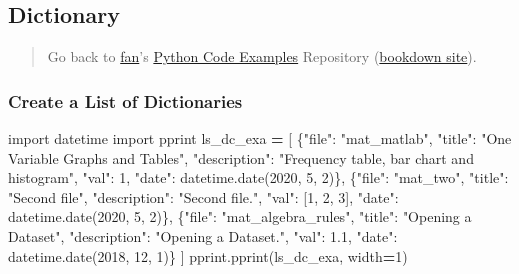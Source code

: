 \documentclass[
]{book}
\newenvironment{Shaded}{\begin{snugshade}}{\end{snugshade}}
\newcommand{\DecValTok}[1]{\textcolor[rgb]{0.00,0.00,0.81}{#1}}
\newcommand{\FloatTok}[1]{\textcolor[rgb]{0.00,0.00,0.81}{#1}}
\newcommand{\ImportTok}[1]{#1}
\newcommand{\NormalTok}[1]{#1}
\newcommand{\OperatorTok}[1]{\textcolor[rgb]{0.81,0.36,0.00}{\textbf{#1}}}
\newcommand{\StringTok}[1]{\textcolor[rgb]{0.31,0.60,0.02}{#1}}
\begin{document}
\hypertarget{dictionary-1}{%
\subsection{Dictionary}\label{dictionary-1}}

\begin{quote}
Go back to \href{http://fanwangecon.github.io/}{fan}'s \href{https://fanwangecon.github.io/pyfan/}{Python Code Examples} Repository (\href{https://fanwangecon.github.io/pyfan/bookdown}{bookdown site}).
\end{quote}

\hypertarget{create-a-list-of-dictionaries}{%
\subsubsection{Create a List of Dictionaries}\label{create-a-list-of-dictionaries}}

\begin{Shaded}
\begin{Highlighting}[]
\ImportTok{import}\NormalTok{ datetime}
\ImportTok{import}\NormalTok{ pprint}
\NormalTok{ls\_dc\_exa }\OperatorTok{=}\NormalTok{  [}
\NormalTok{    \{}\StringTok{"file"}\NormalTok{: }\StringTok{"mat\_matlab"}\NormalTok{,}
     \StringTok{"title"}\NormalTok{: }\StringTok{"One Variable Graphs and Tables"}\NormalTok{,}
     \StringTok{"description"}\NormalTok{: }\StringTok{"Frequency table, bar chart and histogram"}\NormalTok{,}
     \StringTok{"val"}\NormalTok{: }\DecValTok{1}\NormalTok{,}
     \StringTok{"date"}\NormalTok{: datetime.date(}\DecValTok{2020}\NormalTok{, }\DecValTok{5}\NormalTok{, }\DecValTok{2}\NormalTok{)\},}
\NormalTok{    \{}\StringTok{"file"}\NormalTok{: }\StringTok{"mat\_two"}\NormalTok{,}
     \StringTok{"title"}\NormalTok{: }\StringTok{"Second file"}\NormalTok{,}
     \StringTok{"description"}\NormalTok{: }\StringTok{"Second file."}\NormalTok{,}
     \StringTok{"val"}\NormalTok{: [}\DecValTok{1}\NormalTok{, }\DecValTok{2}\NormalTok{, }\DecValTok{3}\NormalTok{],}
     \StringTok{"date"}\NormalTok{: datetime.date(}\DecValTok{2020}\NormalTok{, }\DecValTok{5}\NormalTok{, }\DecValTok{2}\NormalTok{)\},}
\NormalTok{    \{}\StringTok{"file"}\NormalTok{: }\StringTok{"mat\_algebra\_rules"}\NormalTok{,}
     \StringTok{"title"}\NormalTok{: }\StringTok{"Opening a Dataset"}\NormalTok{,}
     \StringTok{"description"}\NormalTok{: }\StringTok{"Opening a Dataset."}\NormalTok{,}
     \StringTok{"val"}\NormalTok{: }\FloatTok{1.1}\NormalTok{,}
     \StringTok{"date"}\NormalTok{: datetime.date(}\DecValTok{2018}\NormalTok{, }\DecValTok{12}\NormalTok{, }\DecValTok{1}\NormalTok{)\}}
\NormalTok{]}
\NormalTok{pprint.pprint(ls\_dc\_exa, width}\OperatorTok{=}\DecValTok{1}\NormalTok{)}
\end{Highlighting}
\end{Shaded}
\end{document}
